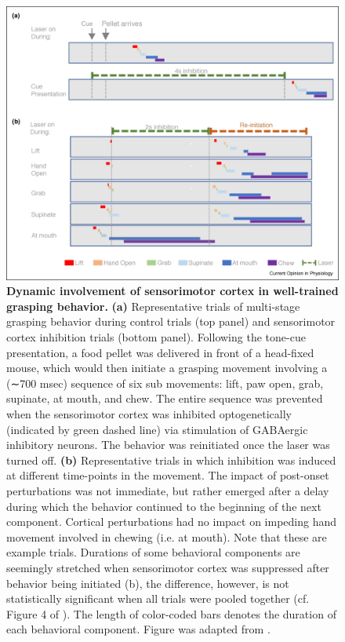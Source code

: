 \begin{refsection}
\begin{figure}
\includegraphics[width=\linewidth]{lin_2021_review_figs/1-s2.0-S2468867320301693-gr1_lrg.jpg}
\caption{\textbf{Dynamic involvement of sensorimotor cortex in well-trained grasping behavior.} \textbf{(a)} Representative trials of multi-stage grasping behavior during control trials (top panel) and sensorimotor cortex inhibition trials (bottom panel). Following the tone-cue presentation, a food pellet was delivered in front of a head-fixed mouse, which would then initiate a grasping movement involving a (∼700 msec) sequence of six sub movements: lift, paw open, grab, supinate, at mouth, and chew. The entire sequence was prevented when the sensorimotor cortex was inhibited optogenetically (indicated by green dashed line) via stimulation of GABAergic inhibitory neurons. The behavior was reinitiated once the laser was turned off. \textbf{(b)} Representative trials in which inhibition was induced at different time-points in the movement. The impact of post-onset perturbations was not immediate, but rather emerged after a delay during which the behavior continued to the beginning of the next component. Cortical perturbations had no impact on impeding hand movement involved in chewing (i.e. at mouth). Note that these are example trials. Durations of some behavioral components are seemingly stretched when sensorimotor cortex was suppressed after behavior being initiated (b), the difference, however, is not statistically significant when all trials were pooled together (cf. Figure 4 of \cite{guo2015a}). The length of color-coded bars denotes the duration of each behavioral component. Figure was adapted from \cite{guo2015a}.}
\label{fig:wrapfig}
\end{figure}




\end{refsection}
